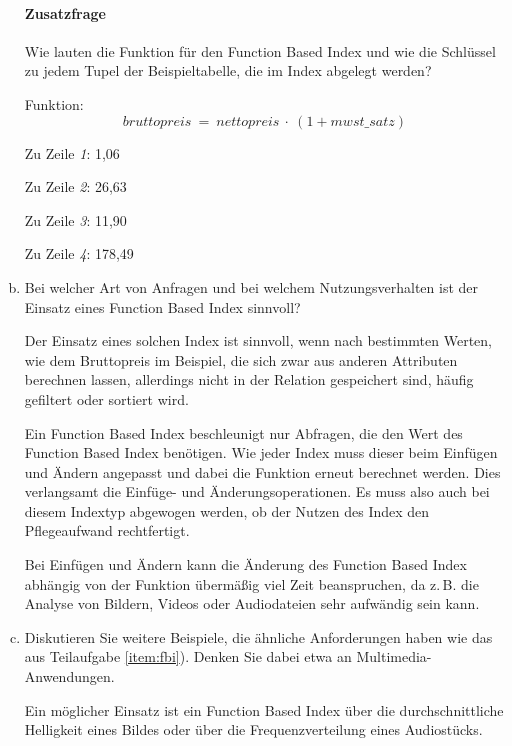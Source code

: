 \begin{enumerate}[a)]
\begin{solution}
\paragraph{Zusatzfrage} Wie lauten die Funktion für den Function Based Index und wie die Schlüssel zu jedem Tupel der Beispieltabelle, die im Index abgelegt werden?

Funktion:
\begin{equation*}
bruttopreis~ =~ nettopreis~ \cdot~ (1 + mwst\_satz)
\end{equation*}

Zu Zeile \textit{1}: 1,06

Zu Zeile \textit{2}: 26,63

Zu Zeile \textit{3}: 11,90

Zu Zeile \textit{4}: 178,49
\end{solution}

\item Bei welcher Art von Anfragen und bei welchem Nutzungsverhalten ist der Einsatz eines Function Based Index sinnvoll?

\begin{solution}
Der Einsatz eines solchen Index ist sinnvoll, wenn nach bestimmten Werten, wie dem Bruttopreis im Beispiel, die sich zwar aus anderen Attributen berechnen lassen, allerdings nicht in der Relation gespeichert sind, häufig gefiltert oder sortiert wird.

Ein Function Based Index beschleunigt nur Abfragen, die den Wert des Function Based Index benötigen.
Wie jeder Index muss dieser beim Einfügen und Ändern angepasst und dabei die Funktion erneut berechnet werden.
Dies verlangsamt die Einfüge- und Änderungsoperationen. Es muss also auch bei diesem Indextyp abgewogen werden, ob der Nutzen des Index den Pflegeaufwand rechtfertigt.
\end{solution}

\begin{note}
Bei Einfügen und Ändern kann die Änderung des Function Based Index abhängig von der Funktion übermäßig viel Zeit beanspruchen, da z.\,B. die Analyse von Bildern, Videos oder Audiodateien sehr aufwändig sein kann.
\end{note}

\item Diskutieren Sie weitere Beispiele, die ähnliche Anforderungen haben wie das aus Teilaufgabe \ref{item:fbi}). Denken Sie dabei etwa an Multimedia-Anwendungen.

\begin{solution}
Ein möglicher Einsatz ist ein Function Based Index über die durchschnittliche Helligkeit eines Bildes oder über die Frequenzverteilung eines Audiostücks.
\end{solution}


\end{enumerate}
